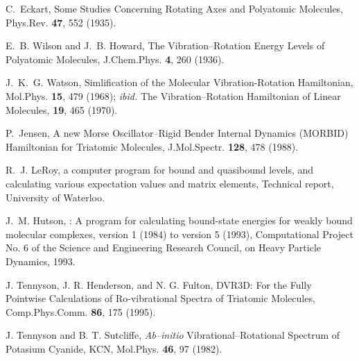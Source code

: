 \begin{thebibliography}{999}




C.~Eckart,
Some Studies Concerning Rotating Axes and Polyatomic
Molecules,
\newblock Phys.Rev. {\bf 47}, 552 (1935).

E.~B. Wilson and J.~B. Howard,
The Vibration--Rotation Energy Levels
of Polyatomic Molecules,
\newblock J.Chem.Phys. {\bf 4}, 260 (1936).

J.~K.~G. Watson,
Simlification of the Molecular Vibration-Rotation
Hamiltonian,
Mol.Phys. {\bf 15}, 479 (1968);
{\it ibid.} 
The Vibration--Rotation Hamiltonian of Linear Molecules,
{\bf 19}, 465 (1970).



P.~Jensen,
A new Morse Oscillator--Rigid Bender Internal
Dynamics (MORBID) Hamiltonian for Triatomic Molecules,
\newblock J.Mol.Spectr. {\bf 128}, 478 (1988).

R.~J. Le{R}oy,
 a 
computer program for bound and quasibound levels, and
calculating various expectation values and matrix elements,
\newblock Technical report, University of Waterloo.

J.~M. Hutson,
: A program for calculating bound-state energies for weakly
bound molecular complexes, version 1 (1984) to version 5 (1993),
\newblock Computational Project No. 6 of the Science and Engineering Research
 Council, on Heavy Particle Dynamics, 1993.

J. Tennyson, J. R. Henderson, and N. G. Fulton,
DVR3D: For the Fully Pointwise Calculations of Ro-vibrational
Spectra of Triatomic Molecules,
Comp.Phys.Comm. {\bf 86}, 175 (1995).



J. Tennyson and B. T. Sutcliffe, 
{\it Ab--initio} Vibrational--Rotational Spectrum of Potasium Cyanide,
KCN,
Mol.Phys. {\bf 46}, 97 (1982).



\end{thebibliography}
